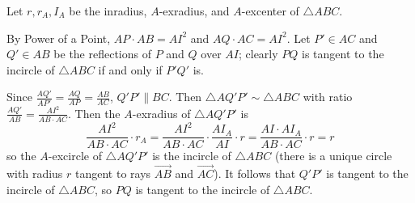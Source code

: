 Let $r,r_A,I_A$ be the inradius, $A$-exradius, and $A$-excenter of $\triangle{ABC}$.

By Power of a Point, $AP\cdot AB=AI^2$ and $AQ\cdot AC=AI^2$. Let $P'\in AC$ and $Q'\in AB$ be the reflections of $P$ and $Q$ over $AI$; clearly $PQ$ is tangent to the incircle of $\triangle{ABC}$ if and only if $P'Q'$ is.

Since $\frac{AQ'}{AP'}=\frac{AQ}{AP}=\frac{AB}{AC}$, $Q'P'\parallel BC$. Then $\triangle{AQ'P'}\sim\triangle{ABC}$ with ratio $\frac{AQ'}{AB}=\frac{AI^2}{AB\cdot AC}$. Then the $A$-exradius of $\triangle{AQ'P'}$ is \[\frac{AI^2}{AB\cdot AC}\cdot r_A=\frac{AI^2}{AB\cdot AC}\cdot\frac{AI_A}{AI}\cdot r=\frac{AI\cdot AI_A}{AB\cdot AC}\cdot r=r\] so the $A$-excircle of $\triangle{AQ'P'}$ is the incircle of $\triangle{ABC}$ (there is a unique circle with radius $r$ tangent to rays $\overrightarrow{AB}$ and $\overrightarrow{AC}$). It follows that $Q'P'$ is tangent to the incircle of $\triangle{ABC}$, so $PQ$ is tangent to the incircle of $\triangle{ABC}$.